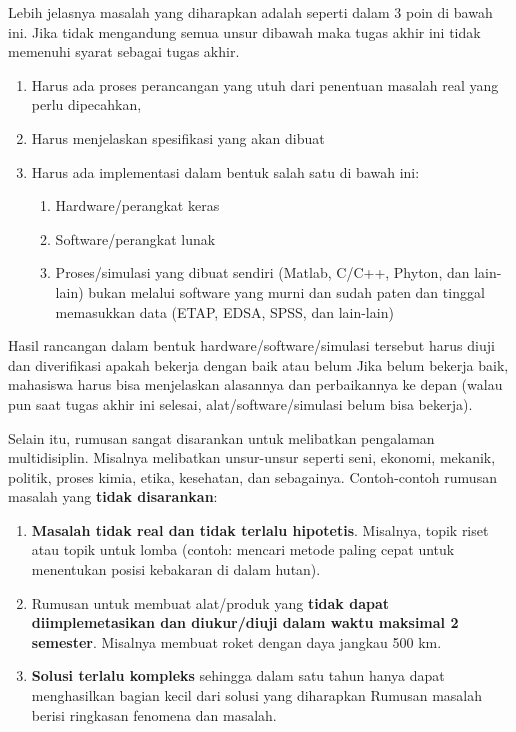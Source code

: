 Lebih jelasnya masalah yang diharapkan adalah seperti dalam 3 poin di bawah ini. Jika tidak mengandung semua unsur dibawah maka tugas akhir ini tidak memenuhi syarat sebagai tugas akhir. \par
\begin{enumerate}
	\item Harus ada proses perancangan yang utuh dari penentuan masalah real yang perlu dipecahkan, 
	\item Harus menjelaskan spesifikasi yang akan dibuat
	\item Harus ada implementasi dalam bentuk salah satu di bawah ini:
	\begin{enumerate}
		\item Hardware/perangkat keras
		\item Software/perangkat lunak
		\item Proses/simulasi yang dibuat sendiri (Matlab, C/C++, Phyton, dan lain-lain) bukan melalui software yang murni dan sudah paten dan tinggal memasukkan data (ETAP, EDSA, SPSS, dan lain-lain)
	\end{enumerate}
\end{enumerate}

Hasil rancangan dalam bentuk hardware/software/simulasi tersebut harus diuji dan diverifikasi apakah bekerja dengan baik atau belum Jika belum bekerja baik, mahasiswa harus bisa menjelaskan alasannya dan perbaikannya ke depan (walau pun saat tugas akhir ini selesai, alat/software/simulasi belum bisa bekerja).\par

Selain itu, rumusan sangat disarankan untuk melibatkan pengalaman multidisiplin. Misalnya melibatkan unsur-unsur seperti seni, ekonomi, mekanik, politik, proses kimia, etika, kesehatan, dan sebagainya. Contoh-contoh rumusan masalah yang \textbf{tidak disarankan}: \par
\begin{enumerate}
	\item \textbf{Masalah tidak real dan tidak terlalu hipotetis}. Misalnya, topik riset atau topik untuk lomba (contoh: mencari metode paling cepat untuk menentukan posisi kebakaran di dalam hutan).
	\item Rumusan untuk membuat alat/produk yang \textbf{tidak dapat diimplemetasikan dan diukur/diuji dalam waktu maksimal 2 semester}. Misalnya membuat roket dengan daya jangkau 500 km.
	\item \textbf{Solusi terlalu kompleks} sehingga dalam satu tahun hanya dapat menghasilkan bagian kecil dari solusi yang diharapkan Rumusan masalah berisi ringkasan fenomena dan masalah.
\end{enumerate}



